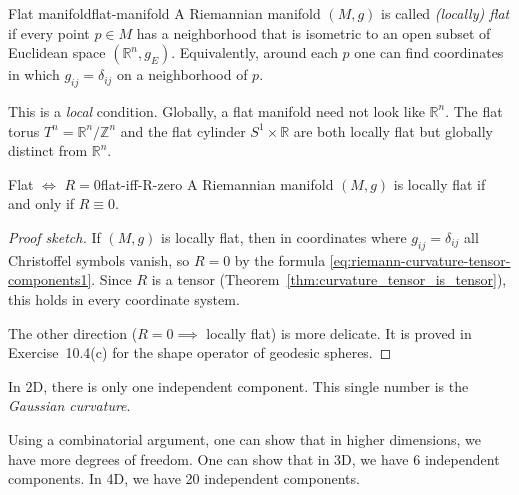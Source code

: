 \begin{colordef}{Flat manifold}{flat-manifold}
A Riemannian manifold $(M, g)$ is called \emph{(locally) flat} if every point $p \in M$ has a neighborhood that is isometric to an open subset of Euclidean space $(\mathbb{R}^n, g_E)$. Equivalently, around each $p$ one can find coordinates in which $g_{ij} = \delta_{ij}$ on a neighborhood of $p$.
\end{colordef}

\begin{colremark}{}{}
This is a \emph{local} condition. Globally, a flat manifold need not look like $\mathbb{R}^n$. The flat torus $T^n = \mathbb{R}^n / \mathbb{Z}^n$ and the flat cylinder $S^1 \times \mathbb{R}$ are both locally flat but globally distinct from $\mathbb{R}^n$.
\end{colremark}

\begin{colorlem}{Flat $\iff$ $R = 0$}{flat-iff-R-zero}
A Riemannian manifold $(M, g)$ is locally flat if and only if $R \equiv 0$.
\end{colorlem}

\begin{proof}[Proof sketch]
If $(M, g)$ is locally flat, then in coordinates where $g_{ij} = \delta_{ij}$ all Christoffel symbols vanish, so $R = 0$ by the formula \eqref{eq:riemann-curvature-tensor-components1}. Since $R$ is a tensor (Theorem~\ref{thm:curvature_tensor_is_tensor}), this holds in every coordinate system.

The other direction ($R = 0 \implies$ locally flat) is more delicate. It is proved in Exercise~10.4(c) for the shape operator of geodesic spheres.
\end{proof}




\begin{colremark}
In 2D, there is only one independent component. This single number is the \emph{Gaussian curvature}. 

Using a combinatorial argument, one can show that in higher dimensions, we have more degrees of freedom. One can show that in 3D, we have 6 independent components. In 4D, we have 20 independent components.

\end{colremark}










